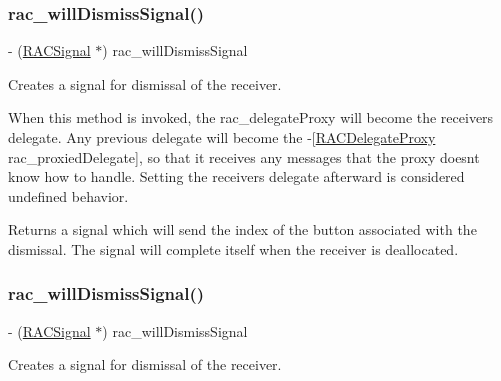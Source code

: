 \subsubsection{\texorpdfstring{rac\+\_\+will\+Dismiss\+Signal()}{rac\_willDismissSignal()}\hspace{0.1cm}{\footnotesize\ttfamily [2/3]}}
{\footnotesize\ttfamily -\/ (\mbox{\hyperlink{interface_r_a_c_signal}{R\+A\+C\+Signal}} $\ast$) rac\+\_\+will\+Dismiss\+Signal \begin{DoxyParamCaption}{ }\end{DoxyParamCaption}}

Creates a signal for dismissal of the receiver.

When this method is invoked, the {\ttfamily rac\+\_\+delegate\+Proxy} will become the receiver\textquotesingle{}s delegate. Any previous delegate will become the -\/\mbox{[}\mbox{\hyperlink{interface_r_a_c_delegate_proxy}{R\+A\+C\+Delegate\+Proxy}} rac\+\_\+proxied\+Delegate\mbox{]}, so that it receives any messages that the proxy doesn\textquotesingle{}t know how to handle. Setting the receiver\textquotesingle{}s {\ttfamily delegate} afterward is considered undefined behavior.

Returns a signal which will send the index of the button associated with the dismissal. The signal will complete itself when the receiver is deallocated. \mbox{\label{category_u_i_alert_view_07_r_a_c_signal_support_08_aa0ae17a8658125f05c58f479cbaf2472}} 
\subsubsection{\texorpdfstring{rac\+\_\+will\+Dismiss\+Signal()}{rac\_willDismissSignal()}\hspace{0.1cm}{\footnotesize\ttfamily [3/3]}}
{\footnotesize\ttfamily -\/ (\mbox{\hyperlink{interface_r_a_c_signal}{R\+A\+C\+Signal}} $\ast$) rac\+\_\+will\+Dismiss\+Signal \begin{DoxyParamCaption}{ }\end{DoxyParamCaption}}

Creates a signal for dismissal of the receiver.

